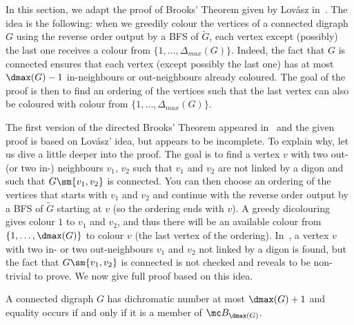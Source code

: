 In this section, we adapt the proof of Brooks' Theorem given by Lov\'asz in~\cite{L75}. 
The idea is the following: when we greedily colour the vertices of a connected digraph $G$ using the reverse order output by a BFS of $\tilde G$, each vertex except (possibly) the last one receives a colour from $\{1, \dots, \Delta_{max}(G)\}$. Indeed, the fact that $G$ is connected ensures that each vertex (except possibly the last one) has at most $\dmax(G) -1$ in-neighbours or out-neighbours already coloured. 
The goal of the proof is then to find an ordering of the vertices such that the last vertex can also be coloured with colour from $\{1, \dots, \Delta_{max}(G)\}$. 

The first version of the directed Brooks' Theorem appeared in~\cite{M10} and the  given proof is based on Lov\'asz' idea, but appears to be incomplete.  
To explain why, let us dive a little deeper into the proof. 
The goal is to find a vertex $v$ with two out- (or two in-) neighbours $v_1$, $v_2$ such that $v_1$ and $v_2$ are not linked by a digon and such that $G \sm \{v_1, v_2\}$ is connected. 
You can then choose an ordering of the vertices that starts with $v_1$ and $v_2$ and continue with the reverse order output by a BFS of $\tilde G$ starting at $v$ (so the ordering ends with $v$). A greedy dicolouring gives colour $1$ to $v_1$ and $v_2$, and thus there will be an available colour from $\{1, \dots, \dmax(G)\}$ to colour $v$ (the last vertex of the ordering). 
In~\cite{M10}, a vertex $v$ with two in- or two out-neighbours $v_1$ and $v_2$ not linked by a digon is found, but the fact that $G \sm \{v_1, v_2\}$ is connected is not checked and reveals to be non-trivial to prove.  
We now give full proof based on this idea. 


\begin{theorem}
A connected digraph $G$ has dichromatic number at most $\dmax(G) +1$ and equality occurs if and only if it is a member of $\mc B_{\dmax(G)}$. 
\end{theorem}

